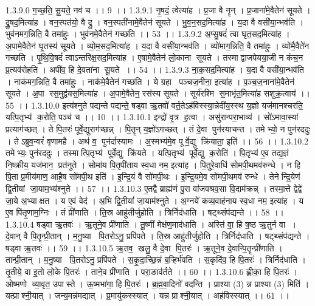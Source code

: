 1.3.9.0
ग॒च्छ॒ति॒ सू॒यते॒ नव॑ च ।। 9 ।।
1.3.9.1
नृ॒षदं॒ त्वेत्या॑ह । प्र॒जा वै नॄन् । प्र॒जाना॑मे॒वैतेन॑ सूयते । द्रु॒षद॒मित्या॑ह । वन॒स्पत॑यो॒ वै द्रु । वन॒स्पती॑नामे॒वैतेन॑ सूयते । भु॒व॒न॒सद॒मित्या॑ह । य॒दा वै वसी॑या॒न्भव॑ति । भुव॑नमग॒न्निति॒ वै तमा॑हुः । भुव॑नमे॒वैतेन॑ गच्छति ।। 53 ।।
1.3.9.2
अ॒प्सु॒षदं॑ त्वा घृत॒सद॒मित्या॑ह । अ॒पामे॒वैतेन॑ घृ॒तस्य॑ सूयते । व्यो॒म॒सद॒मित्या॑ह । य॒दा वै वसी॑या॒न्भव॑ति । व्यो॑माग॒न्निति॒ वै तमा॑हुः । व्यो॑मै॒वैते॑न गच्छति । पृ॒थि॒वि॒षदं॑ त्वाऽन्तरिक्ष॒सद॒मित्या॑ह । ए॒षामे॒वैतेन॑ लो॒काना॑ सूयते । तस्माद्वाजपेयया॒जी न कंच॒न प्र॒त्यव॑रोहति । अपी॑व॒ हि दे॒वता॑ना सू॒यते ।। 54 ।।
1.3.9.3
ना॒क॒सद॒मित्या॑ह । य॒दा वै वसी॑या॒न्भव॑ति । नाक॑मग॒न्निति॒ वै तमा॑हुः । नाक॑मे॒वैतेन॑ गच्छति । ये ग्रहा पञ्चज॒नीना॒ इत्या॑ह । प॒ञ्च॒ज॒नाना॑मे॒वैतेन॑ सूयते । अ॒पा रस॒मुद्व॑यस॒मित्या॑ह । अ॒पामे॒वैतेन॒ रस॑स्य सूयते । सूर्य॑रश्मि स॒माभृ॑त॒मित्या॑ह सशुक्र॒त्वाय॑ ।। 55 ।।
1.3.10.0
इत्य॑श्नुते पद्यन्ते पद्यन्ते॒ षड्वा ऋ॒तवो॑ वर्त॒तेऽह॑विस्स्या॒न्नेदी॑य॒स्स्थ य॒ज्ञो यज॑मानश्चरति॒ यत्पि॒तृभ्य॑ क॒रोति॒ पञ्च॑ च ।। 10 ।।
1.3.10.1
इन्द्रो॑ वृ॒त्र ह॒त्वा । असु॑रान्परा॒भाव्य॑ । सो॑ऽमावा॒स्यां प्रत्याग॑च्छत् । ते पि॒तरः॑ पूर्वे॒द्युराग॑च्छन्न् । पि॒तॄन् य॒ज्ञो॑ऽगच्छत् । तं दे॒वा पुन॑रयाचन्त । तमेभ्यो॒ न पुन॑रददुः । तेऽब्रुव॒न्वरं॑ वृणामहै । अथ॑ व॒ पुन॑र्दास्यामः । अ॒स्मभ्य॑मे॒व पूर्वे॒द्यु क्रि॑याता॒ इति॑ ।। 56 ।।
1.3.10.2
तमेभ्यः॒ पुन॑रददुः । तस्मात्पि॒तृभ्य॑ पूर्वे॒द्यु क्रि॑यते । यत्पि॒तृभ्य॑ पूर्वे॒द्यु क॒रोति॑ । पि॒तृभ्य॑ ए॒व तद्य॒ज्ञं नि॒ष्क्रीय॒ यज॑मान॒ प्रत॑नुते । सोमा॑य पि॒तृपी॑ताय स्व॒धा नम॒ इत्या॑ह । पि॒तुरे॒वाधि॑ सोमपी॒थमव॑रुन्धे । न हि पि॒ता प्र॒मीय॑माण॒ आहै॒ष सो॑मपी॒थ इति॑ । इ॒न्द्रि॒यं वै सो॑मपी॒थः । इ॒न्द्रि॒यमे॒व सो॑मपी॒थमव॑ रुन्धे । तेनेन्द्रि॒येण॑ द्वि॒तीयां जा॒याम॒भ्य॑श्नुते ।। 57 ।।
1.3.10.3
ए॒तद्वै ब्राह्म॑णं पु॒रा वा॑जवश्रव॒सा वि॒दाम॑क्रन्न् । तस्मा॒त्ते द्वेद्वे॑ जा॒ये अ॒भ्याक्षत । य ए॒वं वेद॑ । अ॒भि द्वि॒तीयां॑ जा॒याम॑श्नुते । अ॒ग्नये॑ कव्य॒वाह॑नाय स्व॒धा नम॒ इत्या॑ह । य ए॒व पि॑तृ॒णाम॒ग्निः । तं प्री॑णाति । ति॒स्र आहु॑तीर्जुहोति । त्रिर्निद॑धाति । षट्थ्संप॑द्यन्ते ।। 58 ।।
1.3.10.4
षड्वा ऋ॒तवः॑ । ऋ॒तूने॒व प्री॑णाति । तू॒ष्णीं मेक्ष॑ण॒माद॑धाति । अस्ति॑ वा॒ हि ष॒ष्ठ ऋ॒तुर्न वा । दे॒वान् वै पि॒तॄन्प्री॒तान् । म॒नु॒ष्या पि॒तरोऽनु॒ प्रपि॑पते । ति॒स्र आहु॑तीर्जुहोति । त्रिर्निद॑धाति । षट्थ्संप॑द्यन्ते । षड्वा ऋ॒तवः॑ ।। 59 ।।
1.3.10.5
ऋ॒तव॒ खलु॒ वै दे॒वा पि॒तरः॑ । ऋ॒तूने॒व दे॒वान्पि॒तॄन्प्री॑णाति । तान्प्री॒तान् । म॒नु॒ष्या पि॒तरोऽनु॒ प्रपि॑पते । स॒कृ॒दा॒च्छि॒न्नं ब॒ऱ्हिर्भ॑वति । स॒कृदि॑व॒ हि पि॒तरः॑ । त्रिर्निद॑धाति । तृ॒तीये॒ वा इ॒तो लो॒के पि॒तरः॑ । ताने॒व प्री॑णाति । परा॒ङाव॑र्तते ।। 60 ।।
1.3.10.6
ह्लीका॒ हि पि॒तरः॑ । ओष्मणो व्या॒वृत॒ उपास्ते । ऊ॒ष्मभा॑गा॒ हि पि॒तरः॑ । ब्र॒ह्म॒वा॒दिनो॑ वदन्ति । प्राश्या (3) न्न प्राश्या (3) मिति॑ । यत्प्राश्नी॒यात् । जन्य॒मन्न॑मद्यात् । प्र॒मायु॑कस्स्यात् । यन्न प्राश्नी॒यात् । अह॑विस्स्यात् ।। 61 ।।
